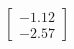 \documentclass[preview]{standalone}
\begin{document}
\begin{align*}
\begin{bmatrix} -1.12 \\ -2.57 \end{bmatrix}
\end{align*}
\end{document}
